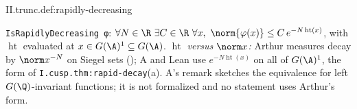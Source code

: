 \begin{definition}
\end{definition}
\begin{tfformal}{II.trunc.def:rapidly-decreasing}
\begin{tffidelity}
\texttt{IsRapidlyDecreasing φ}: $\forall N\in\R\ \exists C\in\R\ \forall x,\ \norm{\varphi(x)}\le C\,e^{-N\operatorname{ht}(x)}$, with $\operatorname{ht}$ evaluated at $x\in G(\A)^1\subseteq G(\A)$. \emph{$\operatorname{ht}$ versus $\norm x$:} Arthur measures decay by $\norm x^{-N}$ on Siegel sets (\cite[§13, before Prop.~13.2]{AIntro}); A and Lean use $e^{-N\operatorname{ht}(x)}$ on all of $G(\A)^1$, the form of \texttt{I.cusp.thm:rapid-decay}(a). A's remark sketches the equivalence for left $G(\Q)$-invariant functions; it is not formalized and no statement uses Arthur's form.
\end{tffidelity}
\end{tfformal}

